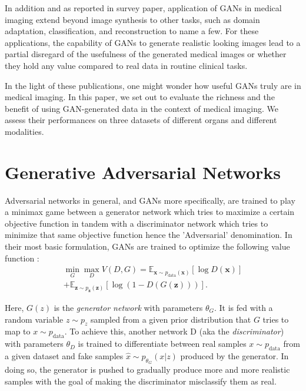 \documentclass[preprint,12pt, authoryear]{elsarticle}
\begin{document}
In addition and as reported in  \cite{Kazeminia2020GANsFM} survey paper, application of GANs in medical imaging extend beyond image synthesis to other tasks, such as domain adaptation, classification, and reconstruction to name a few.
For these applications, the capability of GANs to generate realistic looking images lead to a partial disregard of the usefulness of the generated medical images or whether they hold any value compared to real data in routine clinical tasks.

In the light of these publications, one might wonder how useful GANs truly are in medical imaging.
In this paper, we set out to evaluate the richness and the benefit of using GAN-generated data in the context of medical imaging.  We assess their performances on three datasets of different organs and different modalities.

\section{Generative Adversarial Networks}
\label{sec:gans}
Adversarial networks in general, and GANs more specifically, are trained to play a minimax game between a generator network which tries to maximize a certain objective function in tandem with a discriminator network which tries to minimize that same objective function hence the 'Adversarial' denomination. In their most basic formulation, GANs are trained to optimize the following value function \citep{Goodfellow2014GenerativeAN}:
\begin{equation}
\begin{aligned}
\min_G \max_D V(D, G) = \mathbb{E}_{\bm{x} \sim p_{\text{data}}(\bm{x})}[\log D(\bm{x})] \\ + \mathbb{E}_{\bm{z} \sim p_{\bm{z}}(\bm{z})}[\log (1 - D(G(\bm{z})))].
\end{aligned}
\label{eq:minimaxgame-definition}
\end{equation}

Here, $G(z)$ is the {\em generator network} with parameters $\theta_G$. It is fed with a random variable $z \sim p_{z}$ sampled from a given prior distribution that $G$ tries to map to $x \sim p_{\text{data}}$. To achieve this, another network D (aka the {\em discriminator}) with parameters $\theta_D$ is trained to differentiate between real samples $x \sim p_{\text{data}}$ from a given dataset and fake samples $\hat{x} \sim p_{\theta_G}(x|z)$ produced by the generator. In doing so, the generator is pushed to gradually produce more and more realistic samples with the goal of making the discriminator misclassify them as real.
\end{document}
